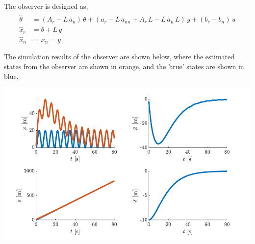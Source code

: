 The observer is designed as, 
\begin{align*}
    \dot{\hat \theta} &= \left(A_r - L\,a_n\right)\,\theta + \left(a_r - L\,a_{nn} + A_r\,L - L\,a_n\,L\right)\,y + (b_r - b_n)\,u \\
    \hat x_r &= \theta + L\,y \\
    \hat x_n &= x_n = y
\end{align*}

The simulation results of the observer are shown below, where the estimated states from the observer are shown in orange, and the 'true' states are shown in blue.

\includegraphics{figures/le4_3_7b.pdf}

